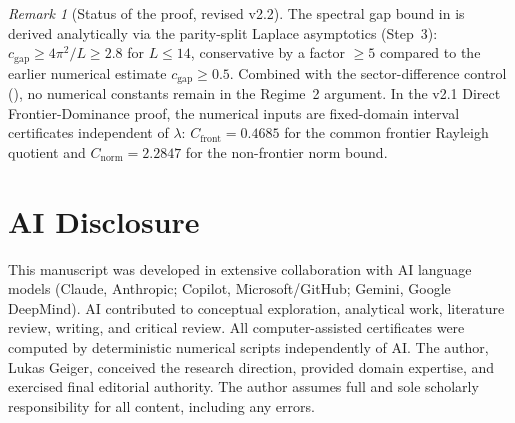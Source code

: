 \documentclass[12pt,a4paper]{article}
\theoremstyle{definition}
\theoremstyle{remark}
\newtheorem{remark}[theorem]{Remark}
\begin{document}
\begin{remark}[Status of the proof, revised v2.2]
The spectral gap bound in  is derived analytically via the parity-split Laplace asymptotics (Step~3): $c_{\mathrm{gap}} \geq 4\pi^2/L \geq 2.8$ for $L \leq 14$, conservative by a factor $\geq 5$ compared to the earlier numerical estimate $c_{\mathrm{gap}} \geq 0.5$. Combined with the sector-difference control (), no numerical constants remain in the Regime~2 argument. In the v2.1 Direct Frontier-Dominance proof, the numerical inputs are fixed-domain interval certificates independent of $\lambda$: $C_{\mathrm{front}} = 0.4685$ for the common frontier Rayleigh quotient and $C_{\mathrm{norm}} = 2.2847$ for the non-frontier norm bound.
\end{remark}


\section*{AI Disclosure}

This manuscript was developed in extensive collaboration with AI language models (Claude, Anthropic; Copilot, Microsoft/GitHub; Gemini, Google DeepMind). AI contributed to conceptual exploration, analytical work, literature review, writing, and critical review. All computer-assisted certificates were computed by deterministic numerical scripts independently of AI. The author, Lukas Geiger, conceived the research direction, provided domain expertise, and exercised final editorial authority. The author assumes full and sole scholarly responsibility for all content, including any errors.




\end{document}
